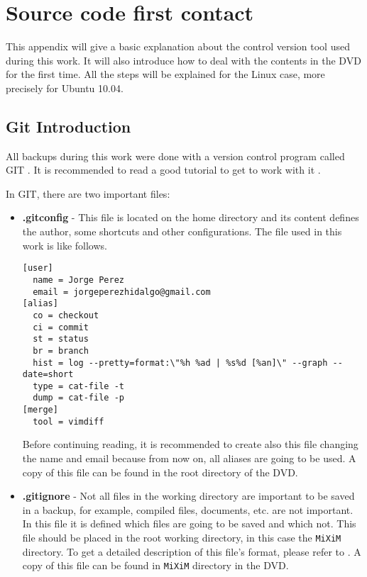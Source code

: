 \chapter{Source code first contact}
\label{chap:installation}

This appendix will give a basic explanation about the control version tool used during this work. It will also introduce how to deal with 
the contents in the \ac{DVD} for the first time. All the steps will be explained for the Linux case, more precisely for Ubuntu 10.04.

\section{Git Introduction}

All backups during this work were done with a version control program called GIT \cite{git}. It is recommended to read a good tutorial to get
to work with it \cite{manualgit}.

In GIT, there are two important files:

\begin{itemize}
  \item \textbf{.gitconfig} - This file is located on the home directory and its content defines the author, some shortcuts and other configurations.
  The file used in this work is like follows.
  \begin{verbatim}
[user]
  name = Jorge Perez
  email = jorgeperezhidalgo@gmail.com
[alias]
  co = checkout
  ci = commit
  st = status
  br = branch
  hist = log --pretty=format:\"%h %ad | %s%d [%an]\" --graph --date=short
  type = cat-file -t
  dump = cat-file -p
[merge]
  tool = vimdiff
  \end{verbatim}

  Before continuing reading, it is recommended to create also this file changing the name and email because from now on, all aliases are going to
  be used. A copy of this file can be found in the root directory of the \ac{DVD}.

  \item \textbf{.gitignore} - Not all files in the working directory are important to be saved in a backup, for example, compiled files, documents, 
  etc. are not important. In this file it is defined which files are going to be saved and which not. This file should be placed in the root working
  directory, in this case the \verb|MiXiM| directory. To get a detailed description of this file's format, please refer to \cite{manualgit}. A copy of 
  this file can be found in \verb|MiXiM| directory in the \ac{DVD}.
  
\end{itemize}


